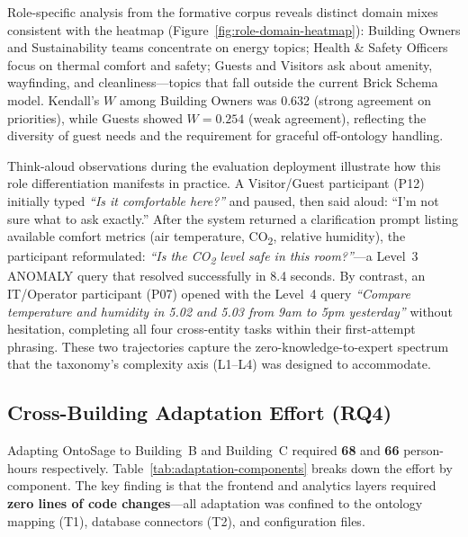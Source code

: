 \documentclass[acmsmall]{acmart}
\begin{document}
Role-specific analysis from the formative corpus reveals distinct domain mixes consistent with the heatmap (Figure~\ref{fig:role-domain-heatmap}): Building Owners and Sustainability teams concentrate on energy topics; Health \& Safety Officers focus on thermal comfort and safety; Guests and Visitors ask about amenity, wayfinding, and cleanliness---topics that fall outside the current Brick Schema model. Kendall's $W$ among Building Owners was 0.632 (strong agreement on priorities), while Guests showed $W=0.254$ (weak agreement), reflecting the diversity of guest needs and the requirement for graceful off-ontology handling.

Think-aloud observations during the evaluation deployment illustrate how this role differentiation manifests in practice. A Visitor/Guest participant (P12) initially typed \emph{``Is it comfortable here?''} and paused, then said aloud: ``I'm not sure what to ask exactly.'' After the system returned a clarification prompt listing available comfort metrics (air temperature, CO\textsubscript{2}, relative humidity), the participant reformulated: \emph{``Is the CO\textsubscript{2} level safe in this room?''}---a Level~3 ANOMALY query that resolved successfully in 8.4 seconds. By contrast, an IT/Operator participant (P07) opened with the Level~4 query \emph{``Compare temperature and humidity in 5.02 and 5.03 from 9am to 5pm yesterday''} without hesitation, completing all four cross-entity tasks within their first-attempt phrasing. These two trajectories capture the zero-knowledge-to-expert spectrum that the taxonomy's complexity axis (L1--L4) was designed to accommodate.

\subsection{Cross-Building Adaptation Effort (RQ4)}
\label{sec:rq4}

Adapting OntoSage to Building~B and Building~C required \textbf{68} and \textbf{66} person-hours respectively. Table~\ref{tab:adaptation-components} breaks down the effort by component. The key finding is that the frontend and analytics layers required \textbf{zero lines of code changes}---all adaptation was confined to the ontology mapping (T1), database connectors (T2), and configuration files.
\end{document}
